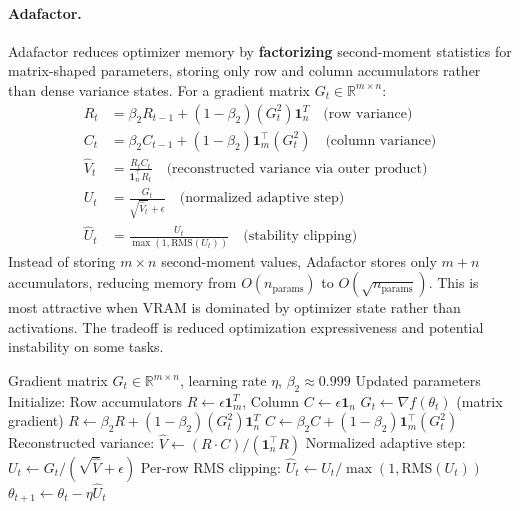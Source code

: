\documentclass[11pt,a4paper]{article}
\begin{document}
\paragraph{Adafactor.}
Adafactor reduces optimizer memory by \textbf{factorizing} second-moment statistics for matrix-shaped parameters, storing only row and column accumulators rather than dense variance states. For a gradient matrix $G_t \in \mathbb{R}^{m \times n}$:
\begin{align}
R_t &= \beta_2 R_{t-1} + (1-\beta_2)(G_t^2) \mathbf{1}_n^T \quad\text{(row variance)} \\
C_t &= \beta_2 C_{t-1} + (1-\beta_2) \mathbf{1}_m^\top (G_t^2) \quad\text{(column variance)} \\
\hat{V}_t &= \frac{R_t C_t}{\mathbf{1}_n^\top R_t} \quad\text{(reconstructed variance via outer product)} \\
U_t &= \frac{G_t}{\sqrt{\hat{V}_t}+\epsilon} \quad\text{(normalized adaptive step)} \\
\hat{U}_t &= \frac{U_t}{\max(1, \text{RMS}(U_t))} \quad\text{(stability clipping)}
\end{align}
Instead of storing $m \times n$ second-moment values, Adafactor stores only $m + n$ accumulators, reducing memory from $O(n_{\text{params}})$ to $O(\sqrt{n_{\text{params}}})$. This is most attractive when VRAM is dominated by optimizer state rather than activations. The tradeoff is reduced optimization expressiveness and potential instability on some tasks.

\begin{algorithm}[H]
\caption{Adafactor (Factorized Second-Moment Statistics)}
\label{alg:adafactor}
\begin{algorithmic}[1]
\Require Gradient matrix $G_t \in \mathbb{R}^{m \times n}$, learning rate $\eta$, $\beta_2 \approx 0.999$
\Ensure Updated parameters
\State Initialize: Row accumulators $R \gets \epsilon \mathbf{1}^T_m$, Column $C \gets \epsilon \mathbf{1}_n$
    \State $G_t \gets \nabla f(\theta_t)$ (matrix gradient)
    \State $R \gets \beta_2 R + (1-\beta_2) (G_t^2) \mathbf{1}_n^T$ 
    \State $C \gets \beta_2 C + (1-\beta_2) \mathbf{1}_m^\top (G_t^2)$ 
    \State Reconstructed variance: $\hat{V} \gets (R \cdot C) / (\mathbf{1}_n^\top R)$ 
    \State Normalized adaptive step: $U_t \gets G_t / (\sqrt{\hat{V}} + \epsilon)$
    \State Per-row RMS clipping: $\hat{U}_t \gets U_t / \max(1, \text{RMS}(U_t))$
    \State $\theta_{t+1} \gets \theta_t - \eta \hat{U}_t$
\EndFor
\end{algorithmic}
\end{algorithm}
\end{document}

